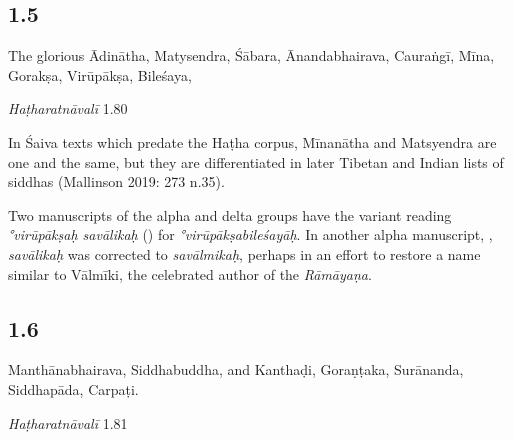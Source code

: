 \begin{ekdosis}
\subsection*{1.5}
\begin{translation}[hp01_005]
The glorious Ādinātha, Matysendra, Śābara, Ānandabhairava, Cauraṅgī, Mīna, Gorakṣa, Virūpākṣa, Bileśaya,
\end{translation}

\begin{testimonia}[hp01_005]
\emph{Haṭharatnāvalī} 1.80

\begin{versinnote}
\end{versinnote}

\end{testimonia}

\begin{philcomm}[hp01_005]     
In Śaiva texts which predate the Haṭha corpus, Mīnanātha and Matsyendra are one and the same, but they are differentiated in later Tibetan and Indian lists of siddhas (Mallinson 2019: 273 n.35).   

Two manuscripts of the alpha and delta groups have the variant reading \emph{°virūpākṣaḥ savālikaḥ} () for \emph{°virūpākṣabileśayāḥ}. In another alpha manuscript, , \emph{savālikaḥ} was corrected to \emph{savālmikaḥ}, perhaps in an effort to restore a name similar to Vālmīki, the celebrated author of the \textit{Rāmāyaṇa}.
\end{philcomm}

\subsection*{1.6}
\begin{translation}[hp01_006]
Manthānabhairava, Siddhabuddha, and Kanthaḍi, Goraṇṭaka, Surānanda, Siddhapāda, Carpaṭi.
\end{translation}

\begin{testimonia}[hp01_006]
\emph{Haṭharatnāvalī} 1.81

\begin{versinnote}
\tl{\var{korandakaḥ ] gonandaka P,T,J,n1,n4}\\!}
\end{versinnote}


\end{testimonia}
\end{ekdosis}
